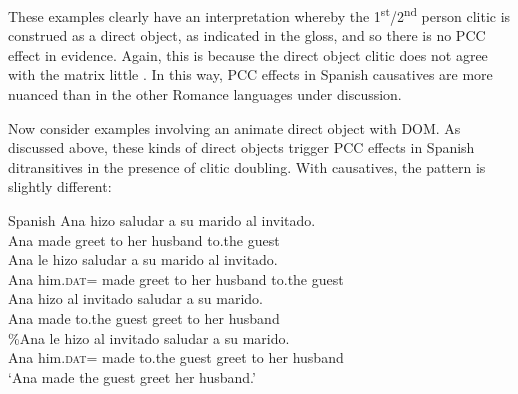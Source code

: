 \documentclass[output=paper,colorlinks,citecolor=brown,nonflat]{langsci/langscibook}
\begin{document}
These examples clearly have an interpretation whereby the 1\textsuperscript{st}/2\textsuperscript{nd} person clitic is construed as a direct object, as indicated in the gloss, and so there is no PCC effect in evidence. Again, this is because the direct object clitic does not agree with the matrix little {\liv}. In this way, PCC effects in Spanish causatives are more nuanced than in the other Romance languages under discussion.

Now consider examples involving an animate direct object with DOM. As discussed above, these kinds of direct objects trigger PCC effects in Spanish ditransitives in the presence of clitic doubling. With causatives, the pattern is slightly different:

\ea%
    \label{ex:sheehan:35}
    Spanish
    \ea\label{ex:sheehan:35a}
    \gll    *Ana   hizo   saludar   a   su   marido   al    invitado.\\
            Ana   made   greet   to   her   husband  to.the   guest\\
    \ex\label{ex:sheehan:35b}
    \gll    *Ana   le   hizo   saludar   a   su   marido   al   invitado.\\
            Ana   him.\textsc{dat}=   made   greet   to   her husband to.the   guest\\
    \ex\label{ex:sheehan:35c}
    \gll    Ana   hizo     al     invitado   saludar   a   su   marido.\\
            Ana   made   to.the   guest   greet   to   her   husband\\
    \ex\label{ex:sheehan:35d}
    \gll    \%Ana le   hizo   al   invitado saludar   a     su   marido.\\
            Ana   him.\textsc{dat}=   made   to.the   guest   greet   to   her   husband\\
    \glt    ‘Ana made the guest greet her husband.’
    \z
\z
\end{document}
